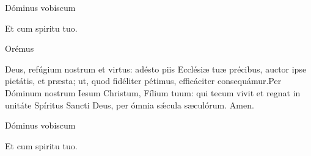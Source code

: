
\rubric{\Vbar} Dóminus vobiscum

\rubric{\Rbar} Et cum spiritu tuo.

Orémus

Deus, refúgium nostrum et virtus: adésto piis Ecclésiæ tuæ précibus, auctor ipse pietátis, et præsta; ut, quod fidéliter pétimus, efficáciter consequámur.Per Dóminum nostrum Iesum Christum, Fílium tuum: qui tecum vivit et regnat in unitáte Spíritus Sancti Deus, per ómnia sǽcula sæculórum.\rubric{\Rbar} Amen.

\rubric{\Vbar} Dóminus vobiscum

\rubric{\Rbar} Et cum spiritu tuo.
